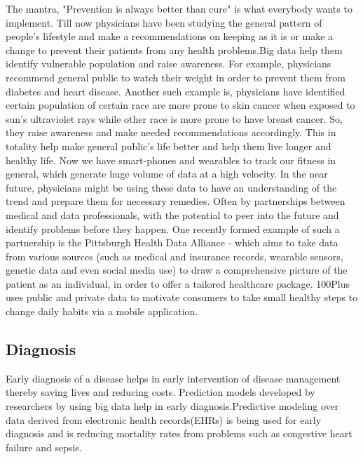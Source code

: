 \documentclass[sigconf]{acmart}
\begin{document}
The mantra, "Prevention is always better than cure" is what everybody
wants to implement. Till now physicians have been studying the general pattern of people's lifestyle and make a recommendations 
on keeping as it is or make a change to prevent their patients from any health problems.Big data help them identify 
vulnerable population and raise awareness. For example, physicians recommend general public to watch their weight in order to prevent 
them from diabetes and heart disease. Another such example is, physicians have identified certain population of certain race are 
more prone to skin cancer when exposed to sun's ultraviolet rays while other race is more prone to have breast cancer. So, they 
raise awareness and make needed recommendations accordingly. This in totality help make general public's life better and help them 
live longer and healthy life. Now we have smart-phones and wearables to track our fitness in general, which generate huge volume 
of data at a high velocity. In the near future, physicians might be using these data to have an understanding of the trend and 
prepare them for necessary remedies. Often by partnerships between medical and data professionals, with the potential to peer
into the future and identify problems before they happen\cite{www-forbes-com}. One recently formed example of such a partnership
is the Pittsburgh Health Data Alliance - which aims to take data from various sources (such as medical and insurance records,
wearable sensors, genetic data and even social media use) to draw a comprehensive picture of the patient as an individual, 
in order to offer a tailored healthcare package\cite{www-forbes-com}. 100Plus uses public and private data to motivate consumers 
to take small healthy steps to change daily habits via a mobile application\cite{www-ghdonline-org}.  

 

\subsection{Diagnosis}
Early diagnosis of a disease helps in early intervention of disease management thereby saving lives and reducing costs. Prediction models developed by researchers by using big data help in early diagnosis.Predictive modeling over data derived from electronic health records(EHRs) is being used for early diagnosis and is reducing mortality rates from problems such as congestive heart failure and sepsis\cite{www-mapr-com}.
\end{document}
